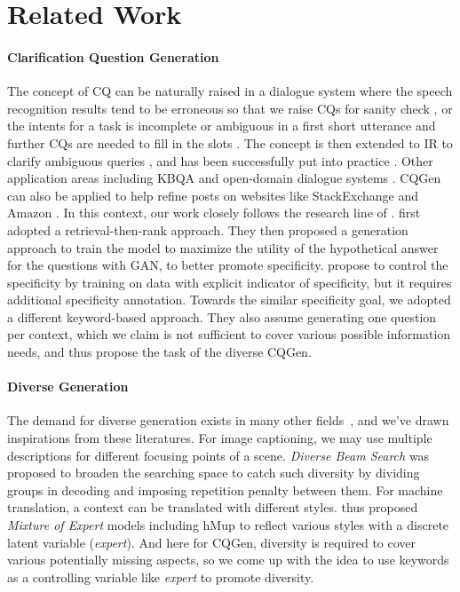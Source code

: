 \section{Related Work}
\paragraph{Clarification Question Generation} The concept of CQ can be naturally raised in a dialogue system where the speech recognition results tend to be erroneous so that we raise CQs for sanity check \citep{stoyanchev2014towards}, or the intents for a task is incomplete or ambiguous in a first short utterance and further CQs are needed to fill in the slots \citep{dhole2020resolving}. The concept is then extended to IR to clarify ambiguous queries \citep{aliannejadi2019asking}, and has been successfully put into practice \citep{zamani2020generating}. Other application areas including KBQA \citep{xu2019asking} and open-domain dialogue systems \citep{aliannejadi2020convai3}. CQGen can also be applied to help refine posts on websites like StackExchange \citep{Kumar_2020} and Amazon \citep{rao2019answer}. In this context, our work closely follows the research line of \citep{rao2018learning, rao2019answer, cao2019controlling}. \citet{rao2018learning} first adopted a retrieval-then-rank approach. They \citep{rao2019answer} then proposed a generation approach to train the model to maximize the utility of the hypothetical answer for the questions with GAN, to better promote specificity. \citet{cao2019controlling} propose to control the specificity by training on data with explicit indicator of specificity, but it requires additional specificity annotation. Towards the similar specificity goal, we adopted a different keyword-based approach. They also assume generating one question per context, which we claim is not sufficient to cover various possible information needs, and thus propose the task of the diverse CQGen.

\paragraph{Diverse Generation} The demand for diverse generation exists in many other fields~\cite{vijayakumar2018diverse, LiangZ18code, shen2019mixture}, and we've drawn inspirations from these literatures. For image captioning, we may use multiple descriptions for different focusing points of a scene. \textit{Diverse Beam Search} \citep{vijayakumar2018diverse} was proposed to broaden the searching space to catch such diversity by dividing groups in decoding and imposing repetition penalty between them. For machine translation, a context can be translated with different styles. \citet{shen2019mixture} thus proposed \textit{Mixture of Expert} models including hMup to reflect various styles with a discrete latent variable (\textit{expert}). And here for CQGen, diversity is required to cover various potentially missing aspects, so we come up with the idea to use keywords as a controlling variable like \textit{expert} to promote diversity.

